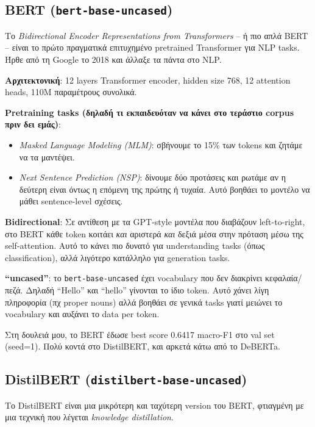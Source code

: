 \documentclass[12pt]{fphw}
\begin{document}
\subsection{BERT (\texttt{bert-base-uncased})}

Το \emph{Bidirectional Encoder Representations from Transformers} -- ή πιο απλά BERT \cite{devlin2019bert} -- είναι το πρώτο πραγματικά επιτυχημένο pretrained Transformer για NLP tasks. Ήρθε από τη Google το 2018 και άλλαξε τα πάντα στο NLP.

\textbf{Αρχιτεκτονική}: 12 layers Transformer encoder, hidden size 768, 12 attention heads, 110M παραμέτρους συνολικά.

\textbf{Pretraining tasks (δηλαδή τι εκπαιδευόταν να κάνει στο τεράστιο corpus πριν δει εμάς)}:
\begin{itemize}
    \item \emph{Masked Language Modeling (MLM)}: σβήνουμε το 15\% των tokens και ζητάμε να τα μαντέψει.
    \item \emph{Next Sentence Prediction (NSP)}: δίνουμε δύο προτάσεις και ρωτάμε αν η δεύτερη είναι όντως η επόμενη της πρώτης ή τυχαία. Αυτό βοηθάει το μοντέλο να μάθει sentence-level σχέσεις.
\end{itemize}

\textbf{Bidirectional}: Σε αντίθεση με τα GPT-style μοντέλα που διαβάζουν left-to-right, στο BERT κάθε token κοιτάει \emph{και} αριστερά \emph{και} δεξιά μέσα στην πρόταση μέσω της self-attention. Αυτό το κάνει πιο δυνατό για understanding tasks (όπως classification), αλλά λιγότερο κατάλληλο για generation tasks.

\textbf{``uncased''}: το \texttt{bert-base-uncased} έχει vocabulary που δεν διακρίνει κεφαλαία/πεζά. Δηλαδή ``Hello'' και ``hello'' γίνονται το ίδιο token. Αυτό χάνει λίγη πληροφορία (πχ proper nouns) αλλά βοηθάει σε γενικά tasks γιατί μειώνει το vocabulary και αυξάνει το data per token.

Στη δουλειά μου, το BERT έδωσε best score 0.6417 macro-F1 στο val set (seed=1). Πολύ κοντά στο DistilBERT, και αρκετά κάτω από το DeBERTa.

\subsection{DistilBERT (\texttt{distilbert-base-uncased})}

Το DistilBERT \cite{sanh2019distilbert} είναι μια μικρότερη και ταχύτερη version του BERT, φτιαγμένη με μια τεχνική που λέγεται \emph{knowledge distillation}.
\end{document}

